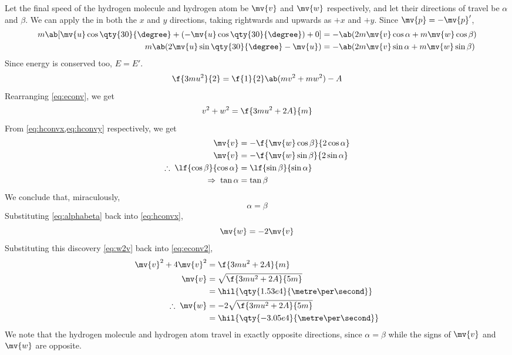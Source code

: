 Let the final speed of the hydrogen molecule and hydrogen atom be
\(\mv{v}\) and \(\mv{w}\) respectively,
and let their directions of travel be \(\alpha\) and \(\beta\).
We can apply the  in both the
\(x\) and \(y\) directions,
taking rightwards and upwards as \(+x\) and \(+y\). Since \(\mv{p}
= -\mv{p}'\),
\begin{align}
	\label{eq:hconvx}
	m\ab[\mv{u}\cos\qty{30}{\degree} + (-\mv{u}\cos\qty{30}{\degree}) +
	0]                                        & = -\ab(2m\mv{v}\cos\alpha + m\mv{w}\cos\beta) \\
	\label{eq:hconvy}
	m\ab(2\mv{u}\sin\qty{30}{\degree}-\mv{u}) & =
	-\ab(2m\mv{v}\sin\alpha + m\mv{w}\sin\beta)
\end{align}
Since energy is conserved too, \(E = E'\).
\begin{equation}
	\f{3mu^2}{2} = \f{1}{2}\ab(mv^2 + mw^2) - A
	\label{eq:econv}
\end{equation}
Rearranging \cref{eq:econv}, we get
\begin{equation}
	v^2 + w^2 = \f{3mu^2 + 2A}{m}
	\label{eq:econv2}
\end{equation}
From \cref{eq:hconvx,eq:hconvy} respectively, we get
\begin{align*}
	\mv{v}                                  & = -\f{\mv{w}\cos\beta}{2\cos\alpha} \\
	\mv{v}                                  & = -\f{\mv{w}\sin\beta}{2\sin\alpha} \\
	\therefore\; \lf{\cos\beta}{\cos\alpha} & = \lf{\sin\beta}{\sin\alpha}        \\
	\Rightarrow\; \tan\alpha                & = \tan\beta
\end{align*}
We conclude that, miraculously,
\begin{equation}
	\alpha = \beta
	\label{eq:alphabeta}
\end{equation}
Substituting \cref{eq:alphabeta} back into \cref{eq:hconvx},
\begin{equation}
	\mv{w} = -2\mv{v}
	\label{eq:w2v}
\end{equation}
Substituting this  discovery \cref{eq:w2v} back into
\ref{eq:econv2},
\begin{align*}
	\mv{v}^2 + 4\mv{v}^2 & = \f{3mu^2+2A}{m}                        \\
	\mv{v}               & = \sqrt{\f{3mu^2+2A}{5m}}                \\
	                     & = \hil{\qty{1.53e4}{\metre\per\second}}  \\
	\therefore\; \mv{w}  & = -2\sqrt{\f{3mu^2+2A}{5m}}              \\
	                     & = \hil{\qty{-3.05e4}{\metre\per\second}}
\end{align*}
We note that the hydrogen molecule and hydrogen atom travel in
exactly opposite directions, since \(\alpha=\beta\) while the signs
of \(\mv{v}\) and \(\mv{w}\)
are opposite.

